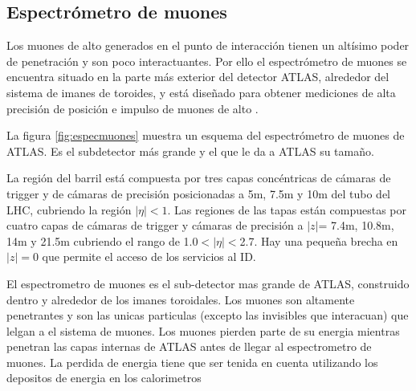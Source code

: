 \subsection{Espectrómetro de muones}
\label{sec:espectrometro_muones}

Los muones de alto {\pt} generados en el punto de interacción tienen un altísimo
poder de penetración y son poco interactuantes. Por ello el espectrómetro de
muones \cite{muonTDR} se encuentra situado en la parte más exterior del detector
ATLAS, alrededor del sistema de imanes de toroides, y está diseñado para obtener
mediciones de alta precisión de posición e impulso de muones de alto \pt.


La figura \ref{fig:especmuones} muestra un esquema del espectrómetro de muones
de ATLAS. Es el subdetector más grande y el que le da a ATLAS su tamaño.

La región del barril está compuesta por tres capas concéntricas de cámaras de
trigger y de cámaras de precisión posicionadas a 5m, 7.5m y 10m del tubo del
LHC, cubriendo la región $|\eta|<1$. Las regiones de las tapas están compuestas
por cuatro capas de cámaras de trigger y cámaras de precisión a $|z|$= 7.4m,
10.8m, 14m y 21.5m cubriendo el rango de 1.0$<|\eta|<$2.7. Hay una pequeña
brecha en $|z|=0$ que permite el acceso de los servicios al ID.

El espectrometro de muones es el sub-detector mas grande de ATLAS, construido
dentro y alrededor de los imanes toroidales. Los muones son altamente penetrantes
y son las unicas particulas (excepto las invisibles que interacuan) que lelgan
a el sistema de muones. Los muones pierden parte de su energia mientras penetran
las capas internas de ATLAS antes de llegar al espectrometro de muones. La perdida
de energia tiene que ser tenida en cuenta utilizando los depositos de energia
en los calorimetros


